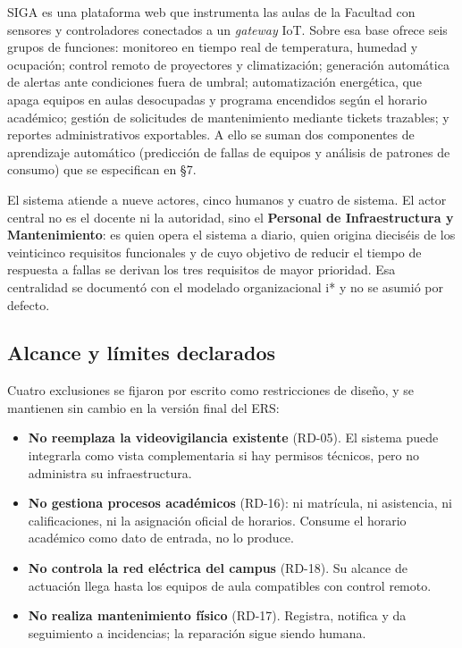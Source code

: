 SIGA es una plataforma web que instrumenta las aulas de la Facultad con sensores y controladores conectados a un \emph{gateway} IoT. Sobre esa base ofrece seis grupos de funciones: monitoreo en tiempo real de temperatura, humedad y ocupaci\'on; control remoto de proyectores y climatizaci\'on; generaci\'on autom\'atica de alertas ante condiciones fuera de umbral; automatizaci\'on energ\'etica, que apaga equipos en aulas desocupadas y programa encendidos seg\'un el horario acad\'emico; gesti\'on de solicitudes de mantenimiento mediante tickets trazables; y reportes administrativos exportables. A ello se suman dos componentes de aprendizaje autom\'atico (predicci\'on de fallas de equipos y an\'alisis de patrones de consumo) que se especifican en \S7.

El sistema atiende a nueve actores, cinco humanos y cuatro de sistema. El actor central no es el docente ni la autoridad, sino el \textbf{Personal de Infraestructura y Mantenimiento}: es quien opera el sistema a diario, quien origina dieciséis de los veinticinco requisitos funcionales y de cuyo objetivo de reducir el tiempo de respuesta a fallas se derivan los tres requisitos de mayor prioridad. Esa centralidad se document\'o con el modelado organizacional i* y no se asumi\'o por defecto.

\subsection{Alcance y l\'imites declarados}

Cuatro exclusiones se fijaron por escrito como restricciones de dise\~no, y se mantienen sin cambio en la versi\'on final del ERS:

\begin{itemize}
\item \textbf{No reemplaza la videovigilancia existente} (RD-05). El sistema puede integrarla como vista complementaria si hay permisos t\'ecnicos, pero no administra su infraestructura.
\item \textbf{No gestiona procesos acad\'emicos} (RD-16): ni matr\'icula, ni asistencia, ni calificaciones, ni la asignaci\'on oficial de horarios. Consume el horario acad\'emico como dato de entrada, no lo produce.
\item \textbf{No controla la red el\'ectrica del campus} (RD-18). Su alcance de actuaci\'on llega hasta los equipos de aula compatibles con control remoto.
\item \textbf{No realiza mantenimiento f\'isico} (RD-17). Registra, notifica y da seguimiento a incidencias; la reparaci\'on sigue siendo humana.
\end{itemize}

